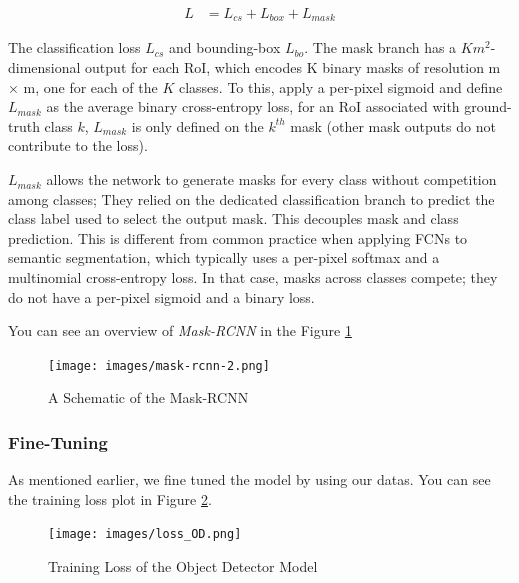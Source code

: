 \documentclass[a4paper, openany]{book}
\begin{document}
\begin{eqnarray*}
L &= L_{cs} +L_{box}+L_{mask}
\end{eqnarray*}

The classification loss $L_{cs}$ and bounding-box $L_{bo}$. The mask branch has a $Km^2$-dimensional output for each RoI, which encodes K binary masks of resolution m × m, one for each of the $K$ classes. To this, apply a per-pixel sigmoid and define $L_{mask}$ as the average binary cross-entropy loss, for an RoI associated with ground-truth class $k$, $L_{mask}$ is only defined on the $k^{th}$ mask (other mask outputs do not contribute to the loss).

$L_{mask}$ allows the network to generate masks for every class without competition among classes; They relied on the dedicated classification branch to predict the class label used to select the output mask. This decouples mask and class prediction. This is different from common practice when applying FCNs to semantic segmentation, which typically uses a per-pixel softmax and a multinomial cross-entropy loss. In that case, masks across classes compete; they do not have a per-pixel sigmoid and a binary loss.

You can see an overview of \textit{Mask-RCNN} in the Figure \ref{fig:mask-rcnn-2}

\begin{figure}[ht]
  \centering
    \texttt{[image: images/mask-rcnn-2.png]}
      \caption{A Schematic of the Mask-RCNN}
  \label{fig:mask-rcnn-2}
\end{figure}

\newpage
\subsubsection{Fine-Tuning}
	\vspace{0.3cm}

As mentioned earlier, we fine tuned the model by using our datas. You can see the training loss plot in Figure \ref{fig:loss_OD}.

\begin{figure}[ht]
  \centering
    \texttt{[image: images/loss\_OD.png]}
      \caption{Training Loss of the Object Detector Model}
  \label{fig:loss_OD}
\end{figure}
\end{document}
